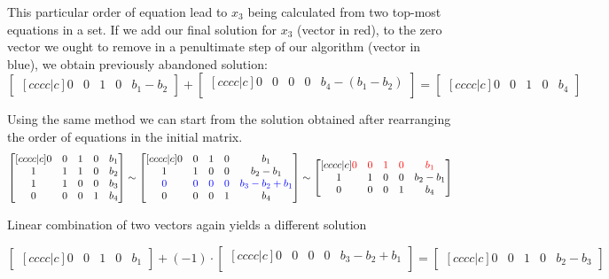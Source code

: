This particular order of equation lead to $x_3$ being calculated from two top-most equations in a set.
If we add our final solution for $x_3$ (vector in red), to the zero vector we ought to remove in a penultimate step of our algorithm (vector in blue), we obtain previously abandoned solution:
\begin{equation}
\begin{bmatrix}[cccc|c]
    0 & 0 & 1 & 0 & b_1-b_2
\end{bmatrix}
+
\begin{bmatrix}[cccc|c]
    0 & 0 & 0 & 0 & b_4 - (b_1 - b_2) \\ 
\end{bmatrix}
=
\begin{bmatrix}[cccc|c]
    0 & 0 & 1 & 0 & b_4
\end{bmatrix}
\end{equation}

Using the same method we can start from the solution obtained after rearranging the order of equations in the initial matrix.
\begin{equation}
\begin{bmatrix}[cccc|c]
    0 & 0 & 1 & 0 & b_1 \\
    1 & 1 & 1 & 0 & b_2 \\ 
    1 & 1 & 0 & 0 & b_3 \\ 
    0 & 0 & 0 & 1 & b_4 \\ 
\end{bmatrix}
\sim
\begin{bmatrix}[cccc|c]
    0 & 0 & 1 & 0 & b_1 \\ 
    1 & 1 & 0 & 0 & b_2-b_1 \\ 
    \textcolor{blue}{0} & \textcolor{blue}{0} & \textcolor{blue}{0} & \textcolor{blue}{0} &\textcolor{blue}{b_3 - b_2 + b_1} \\ 
    0 & 0 & 0 & 1 & b_4
\end{bmatrix}
\sim
\begin{bmatrix}[cccc|c]
    \textcolor{red}{0} & \textcolor{red}{0} & \textcolor{red}{1} & \textcolor{red}{0} &\textcolor{red}{b_1} \\ 
    1 & 1 & 0 & 0 & b_2-b_1 \\ 
    0 & 0 & 0 & 1 & b_4
\end{bmatrix}
\end{equation}

Linear combination of two vectors again yields a different solution

\begin{equation}
\begin{bmatrix}[cccc|c]
    0 & 0 & 1 & 0 & b_1
\end{bmatrix}
+
(-1)\cdot
\begin{bmatrix}[cccc|c]
    0 & 0 & 0 & 0 & b_3 - b_2 + b_1 \\ 
\end{bmatrix}
=
\begin{bmatrix}[cccc|c]
    0 & 0 & 1 & 0 & b_2-b_3
\end{bmatrix}
\end{equation}

